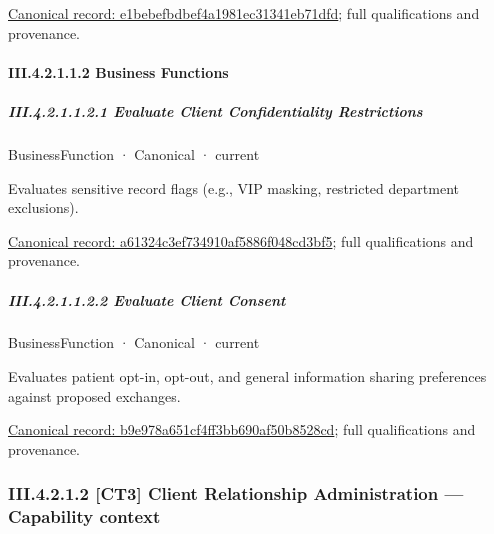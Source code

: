 {\footnotesize \href{../../../../../../../continuum/business/business-service/e1bebefbdbef4a1981ec31341eb71dfd.md}{Canonical record: e1bebefbdbef4a1981ec31341eb71dfd}; full qualifications and provenance.}\par
\paragraph*{III.4.2.1.1.2 Business Functions}
\label{navigation:III.4.2.1.1.2}

\subparagraph*{III.4.2.1.1.2.1 Evaluate Client Confidentiality Restrictions}
\label{navigation:III.4.2.1.1.2.1}

\label{element:a61324c3ef734910af5886f048cd3bf5}
{\small BusinessFunction · Canonical · current}\par

Evaluates sensitive record flags (e.g., VIP masking, restricted department exclusions).


{\footnotesize \href{../../../../../../../continuum/business/business-function/a61324c3ef734910af5886f048cd3bf5.md}{Canonical record: a61324c3ef734910af5886f048cd3bf5}; full qualifications and provenance.}\par
\subparagraph*{III.4.2.1.1.2.2 Evaluate Client Consent}
\label{navigation:III.4.2.1.1.2.2}

\label{element:b9e978a651cf4ff3bb690af50b8528cd}
{\small BusinessFunction · Canonical · current}\par

Evaluates patient opt-in, opt-out, and general information sharing preferences against proposed exchanges.


{\footnotesize \href{../../../../../../../continuum/business/business-function/b9e978a651cf4ff3bb690af50b8528cd.md}{Canonical record: b9e978a651cf4ff3bb690af50b8528cd}; full qualifications and provenance.}\par
\subsubsection*{III.4.2.1.2 [CT3] Client Relationship Administration — Capability context}
\label{navigation:III.4.2.1.2}

